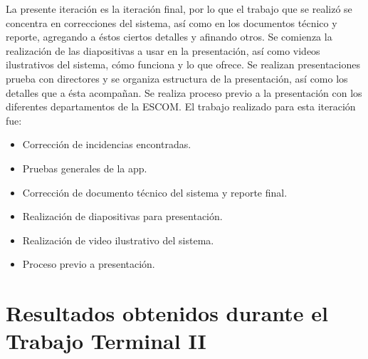 \noindent
La presente iteración es la iteración final, por lo que el trabajo que se realizó se concentra en correcciones del sistema, así como en los documentos técnico y reporte, agregando a éstos ciertos detalles y afinando otros. Se comienza la realización de las diapositivas a usar en la presentación, así como videos ilustrativos del sistema, cómo funciona y lo que ofrece. Se realizan presentaciones prueba con directores y se organiza estructura de la presentación, así como los detalles que a ésta acompañan.
Se realiza proceso previo a la presentación con los diferentes departamentos de la ESCOM. 
\newline
El trabajo realizado para esta iteración fue:
\begin{itemize}
	\item Corrección de incidencias encontradas.
	\item Pruebas generales de la app. 
	\item Corrección de documento técnico del sistema y reporte final.
	\item Realización de diapositivas para presentación.
	\item Realización de video ilustrativo del sistema.
	\item Proceso previo a presentación.
\end{itemize}



\section{Resultados obtenidos durante el Trabajo Terminal II}

